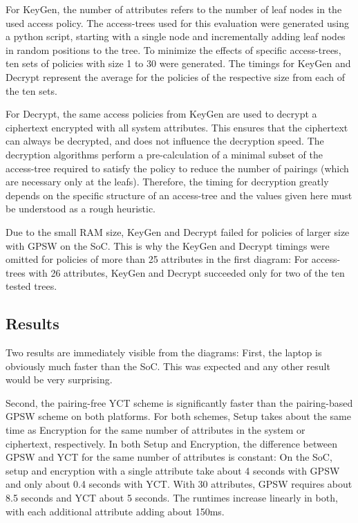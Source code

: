 For KeyGen, the number of attributes refers to the number of leaf nodes in the used access policy.
The \glspl{access-tree} used for this evaluation were generated using a python script, starting with a single node and incrementally adding leaf nodes in random positions to the tree.
To minimize the effects of specific \glspl{access-tree}, ten sets of policies with size 1 to 30 were generated.
The timings for KeyGen and Decrypt represent the average for the policies of the respective size from each of the ten sets.

For Decrypt, the same access policies from KeyGen are used to decrypt a ciphertext encrypted with all system attributes.
This ensures that the ciphertext can always be decrypted, and does not influence the decryption speed.
The decryption algorithms perform a pre-calculation of a minimal subset of the \gls{access-tree} required to satisfy the policy to reduce the number of pairings (which are necessary only at the leafs).
Therefore, the timing for decryption greatly depends on the specific structure of an \gls{access-tree} and the values given here must be understood as a rough heuristic.

Due to the small RAM size, KeyGen and Decrypt failed for policies of larger size with GPSW on the SoC.
This is why the KeyGen and Decrypt timings were omitted for policies of more than 25 attributes in the first diagram:
For \glspl{access-tree} with 26 attributes, KeyGen and Decrypt succeeded only for two of the ten tested trees.

\subsection{Results}
Two results are immediately visible from the diagrams:
First, the laptop is obviously much faster than the SoC.
This was expected and any other result would be very surprising.

Second, the pairing-free YCT scheme is significantly faster than the pairing-based GPSW scheme on both platforms. 
For both schemes, Setup takes about the same time as Encryption for the same number of attributes in the system or ciphertext, respectively.
In both Setup and Encryption, the difference between GPSW and YCT for the same number of attributes is constant:
On the SoC, setup and encryption with a single attribute take about 4 seconds with GPSW and only about 0.4 seconds with YCT.
With 30 attributes, GPSW requires about 8.5 seconds and YCT about 5 seconds.
The runtimes increase linearly in both, with each additional attribute adding about 150ms.

